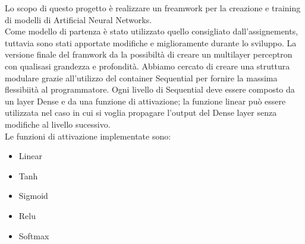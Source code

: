 Lo scopo di questo progetto è realizzare un freamwork per la creazione e training di modelli di Artificial Neural Networks. \\
Come modello di partenza è stato utilizzato quello consigliato dall'assignements, tuttavia sono stati apportate modifiche e miglioramente durante lo sviluppo. La versione finale del framwork da la possibiltà di creare un multilayer perceptron con qualisasi grandezza e profondità. Abbiamo cercato di creare una struttura modulare grazie all'utilizzo del container Sequential per fornire la massima flessibiità al programmatore. Ogni livello di Sequential deve essere composto da un layer Dense e da una funzione di attivazione; la funzione linear può essere utilizzata nel caso in cui si voglia propagare l'output del Dense layer senza modifiche al livello sucessivo. \\
Le funzioni di attivazione implementate sono:
\begin{itemize}
	\item Linear
	\item Tanh
	\item Sigmoid
	\item Relu
	\item Softmax
\end{itemize}